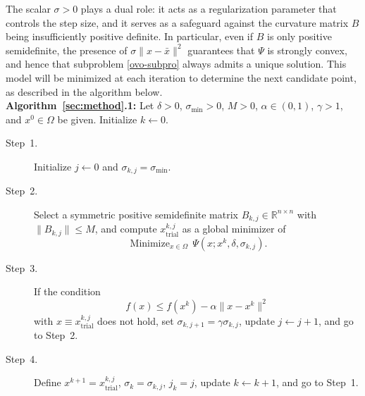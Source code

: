 \documentclass[11pt]{article}
\newcommand{\xkjtrial}{x^{k,j}_{\mathrm{trial}}}
\newcommand{\minimize}{\mathop{\text{Minimize}}}
\begin{document}
The scalar $\sigma > 0$ plays a dual role: it acts as a regularization 
parameter that controls the step size, and it serves as a safeguard 
against the curvature matrix $B$ being insufficiently positive definite. 
In particular, even if $B$ is only positive semidefinite, the presence 
of $\sigma \|x - \bar{x}\|^2$ guarantees that $\Psi$ is strongly 
convex, and hence that subproblem \eqref{ovo-subpro} always admits a 
unique solution. This model will be minimized at each iteration to 
determine the next candidate point, as described in the algorithm 
below.\\

\noindent
\textbf{Algorithm~\ref{sec:method}.1:} Let $\delta > 0$, 
$\sigma_{\min} > 0$, $M > 0$, $\alpha \in (0,1)$, $\gamma > 1$, and 
$x^0 \in \Omega$ be given. Initialize $k \leftarrow 0$.

\begin{description}

\item[Step~1.] Initialize $j \leftarrow 0$ and 
$\sigma_{k,j} = \sigma_{\min}$.

\item[Step~2.] Select a symmetric positive semidefinite matrix 
$B_{k,j} \in \mathbb{R}^{n \times n}$ with $\|B_{k,j}\| \leq M$, 
and compute $\xkjtrial$ as a global minimizer of
    \begin{equation} \label{ovo-subpro}
    \minimize_{x \in \Omega}\, \Psi(x; x^k, \delta, \sigma_{k,j}).
    \end{equation}

\item[Step~3.] If the condition
    \begin{equation} \label{ovo-armijo}
    f(x) \leq f(x^k) - \alpha \|x - x^k\|^2
    \end{equation}
with $x \equiv \xkjtrial$ does not hold, set 
$\sigma_{k,j+1} = \gamma \sigma_{k,j}$, update $j \leftarrow j + 1$, 
and go to Step~2.

\item[Step~4.] Define $x^{k+1} = \xkjtrial$, $\sigma_k = \sigma_{k,j}$, 
$j_k = j$, update $k \leftarrow k+1$, and go to Step~1.

\end{description}
\end{document}
